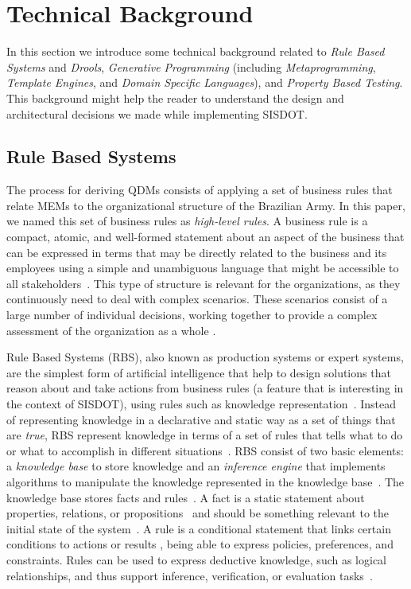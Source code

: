 \documentclass[AMA,STIX1COL,hidelinks]{WileyNJD-v2}
\newcommand{\callers}{\emph{high-level rules}\xspace}
\begin{document}
\section{Technical Background}
\label{back}


In this section we
introduce some technical background related to \emph{Rule Based Systems} and
\emph{Drools}, \emph{Generative Programming} (including \emph{Metaprogramming},
\emph{Template Engines}, and \emph{Domain Specific Languages}), and
\emph{Property Based Testing}. This background might help the reader to
understand the design and architectural decisions we made
while implementing SISDOT.  



\subsection{Rule Based Systems}
\label{sec:rbs}
The process for deriving QDMs consists of applying a set of business rules that relate MEMs to the organizational structure of the Brazilian Army. In this paper, we named this set of business rules as \callers. A business rule is a compact, atomic, and well-formed statement about an aspect of the business that can be expressed in terms that may be directly related to the business and its employees using a simple and unambiguous language that might be accessible to all stakeholders~\cite{graham2007business}. This type of structure is relevant for the organizations, as they continuously need to deal with complex scenarios. These scenarios consist of a large number of individual decisions, working together to provide a complex assessment of the organization as a whole \cite{salatino2016mastering}.

Rule Based Systems (RBS), also known as production systems or expert systems, are the simplest form of artificial intelligence that help to design solutions that reason about and take actions from business rules (a feature that is interesting in the context of SISDOT), using rules such as knowledge representation~\cite{grosan2011}. Instead of representing knowledge in a declarative and static way as a set of things that are \emph{true}, RBS represent knowledge in terms of a set of rules that tells what to do or what to accomplish in different situations~\cite{grosan2011}. RBS consist of two basic elements: a \emph{knowledge base} to store knowledge and an \emph{inference engine} that implements  algorithms to manipulate the knowledge represented in the knowledge base~\cite{grosan2011,DBLP:books/daglib/0070547,gallacher1989}. The knowledge base stores facts and rules~\cite{DBLP:journals/cacm/Hayes-Roth85}. A fact is a static statement about properties, relations, or propositions~\cite{DBLP:journals/cacm/Hayes-Roth85} and should be something relevant to the initial state of the system~\cite{grosan2011}. A rule is a conditional statement that links certain conditions to actions or results \cite{abraham2005}, being able to express policies, preferences, and constraints. Rules can be used to express deductive knowledge, such as logical relationships, and thus support inference, verification, or evaluation tasks~\cite{DBLP:journals/cacm/Hayes-Roth85}.
\end{document}

